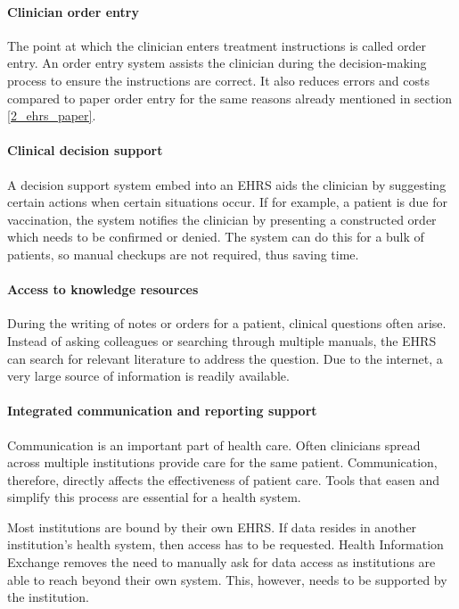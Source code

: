         \paragraph{Clinician order entry} The point at which the clinician enters treatment instructions is called order entry. An order entry system assists the clinician during the decision-making process to ensure the instructions are correct. It also reduces errors and costs compared to paper order entry for the same reasons already mentioned in section \ref{2_ehrs_paper}.

        \paragraph{Clinical decision support} A decision support system embed into an EHRS aids the clinician by suggesting certain actions when certain situations occur. If for example, a patient is due for vaccination, the system notifies the clinician by presenting a constructed order which needs to be confirmed or denied. The system can do this for a bulk of patients, so manual checkups are not required, thus saving time.

        \paragraph{Access to knowledge resources} During the writing of notes or orders for a patient, clinical questions often arise. Instead of asking colleagues or searching through multiple manuals, the EHRS can search for relevant literature to address the question. Due to the internet, a very large source of information is readily available.

        \paragraph{Integrated communication and reporting support} Communication is an important part of health care. Often clinicians spread across multiple institutions provide care for the same patient. Communication, therefore, directly affects the effectiveness of patient care. Tools that easen and simplify this process are essential for a health system. 

        Most institutions are bound by their own EHRS. If data resides in another institution's health system, then access has to be requested. Health Information Exchange removes the need to manually ask for data access as institutions are able to reach beyond their own system. This, however, needs to be supported by the institution.\\
        
